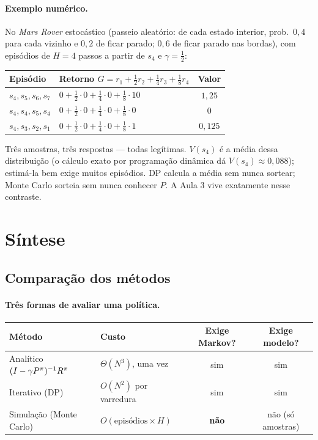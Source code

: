 \documentclass[11pt, a4paper]{article}
\begin{document}
\paragraph{Exemplo numérico.} No \emph{Mars Rover} estocástico (passeio aleatório: de
cada estado interior, prob.\ $0{,}4$ para cada vizinho e $0{,}2$ de ficar parado;
$0{,}6$ de ficar parado nas bordas), com episódios de $H = 4$ passos a partir de $s_4$ e
$\gamma = \tfrac12$:

\begin{center}
\begin{tabular}{@{}llc@{}}
\toprule
\textbf{Episódio} & \textbf{Retorno } $G = r_1 + \tfrac12 r_2 + \tfrac14 r_3 + \tfrac18 r_4$ & \textbf{Valor} \\
\midrule
$s_4, s_5, s_6, s_7$ & $0 + \tfrac12 \cdot 0 + \tfrac14 \cdot 0 + \tfrac18 \cdot 10$ & $1{,}25$ \\
$s_4, s_4, s_5, s_4$ & $0 + \tfrac12 \cdot 0 + \tfrac14 \cdot 0 + \tfrac18 \cdot 0$  & $0$ \\
$s_4, s_3, s_2, s_1$ & $0 + \tfrac12 \cdot 0 + \tfrac14 \cdot 0 + \tfrac18 \cdot 1$  & $0{,}125$ \\
\bottomrule
\end{tabular}
\end{center}

Três amostras, três respostas --- todas legítimas. $V(s_4)$ é a média dessa distribuição
(o cálculo exato por programação dinâmica dá $V(s_4) \approx 0{,}088$); estimá-la bem
exige muitos episódios. DP calcula a média sem nunca sortear; Monte Carlo sorteia sem
nunca conhecer $P$. A Aula 3 vive exatamente nesse contraste.

\section{Síntese}

\subsection{Comparação dos métodos}

\paragraph{Três formas de avaliar uma política.}

\begin{center}
\begin{tabular}{@{}p{3.2cm}p{3.6cm}cc@{}}
\toprule
\textbf{Método} & \textbf{Custo} & \textbf{Exige Markov?} & \textbf{Exige modelo?} \\
\midrule
Analítico $(I - \gamma P^{\pi})^{-1} R^{\pi}$ & $\Theta(N^3)$, uma vez & sim & sim \\
Iterativo (DP) & $O(N^2)$ por varredura & sim & sim \\
Simulação (Monte Carlo) & $O(\text{episódios} \times H)$ & \textbf{não} & não (só amostras) \\
\bottomrule
\end{tabular}
\end{center}
\end{document}
